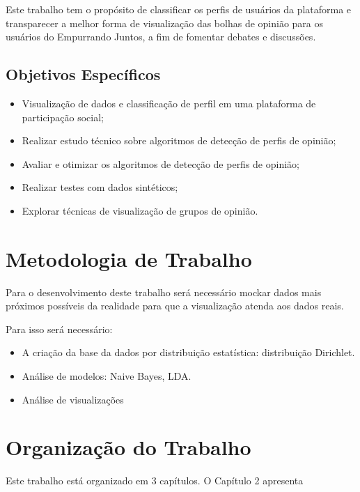 Este trabalho tem o propósito de classificar os perfis de usuários da plataforma e transparecer a melhor forma de visualização das bolhas de opinião para os usuários do Empurrando Juntos, a fim de fomentar debates e discussões.

\subsection{Objetivos Específicos}

\begin{itemize}
	\item Visualização de dados e classificação de perfil em uma plataforma de participação social;
	\item Realizar estudo técnico sobre algoritmos de detecção de perfis de opinião;
	\item Avaliar e otimizar os algoritmos de detecção de perfis de opinião;
	\item Realizar testes com dados sintéticos;
	\item Explorar técnicas de visualização de grupos de opinião. %
	
\end{itemize}

\section{Metodologia de Trabalho}

Para o desenvolvimento deste trabalho será necessário mockar dados mais próximos possíveis da realidade para que a visualização atenda aos dados reais.

Para isso será necessário:
\begin{itemize}
	\item A criação da base da dados por distribuição estatística: distribuição Dirichlet.
	\item Análise de modelos: Naive Bayes, LDA.
	\item Análise de visualizações
\end{itemize}

\section{Organização do Trabalho}

Este trabalho está organizado em 3 capítulos. O Capítulo 2 apresenta 

